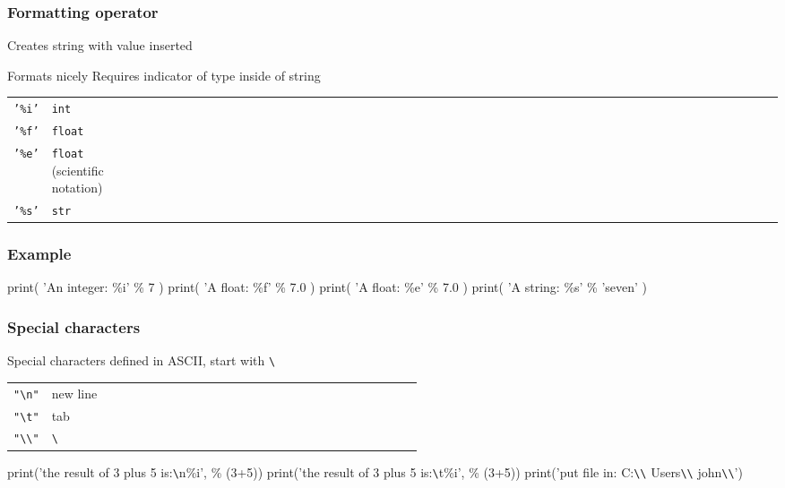 \documentclass[11pt]{beamer}
\begin{document}
\begin{frame}
  \frametitle{Formatting operator}
  \Enlarge

  \begin{itemize}
  \myitem  Creates string with value inserted
    \begin{itemize}
    \mysubitem  Formats nicely
    \mysubitem  Requires indicator of type inside of string
      \begin{tabular}{*{27}{ll}}
        \texttt{'\%i'} & \texttt{int} \\
        \texttt{'\%f'} & \texttt{float} \\
        \texttt{'\%e'} & \texttt{float} (scientific notation) \\
        \texttt{'\%s'} & \texttt{str}
      \end{tabular}
    \end{itemize}
  \end{itemize}
\end{frame}

\begin{frame}[fragile]
  \frametitle{Example}
  \Enlarge

  \begin{semiverbatim}
print( 'An integer:  \%i' \% 7 )
print( 'A float:     \%f' \% 7.0 )
print( 'A float:     \%e' \% 7.0 )
print( 'A string:    \%s' \% 'seven' )
  \end{semiverbatim}
\end{frame}

\begin{frame}
  \frametitle{Special characters}
  \Enlarge

  \begin{itemize}
  \myitem  Special characters defined in ASCII, start with \texttt{\textbackslash}
    \begin{tabular}{*{27}{l}}
      \texttt{"\textbackslash n"} & new line \\
      \texttt{"\textbackslash t"} & tab \\
      \texttt{"\textbackslash \textbackslash"} & \texttt{\textbackslash} \\
    \end{tabular}
  \myitem print('the result of 3 plus 5 is:\texttt{\textbackslash}n\%i', \% (3+5))
  \myitem print('the result of 3 plus 5 is:\texttt{\textbackslash}t\%i', \% (3+5))
  \myitem print('put file in: C:\texttt{\textbackslash \textbackslash} Users\texttt{\textbackslash \textbackslash} john\texttt{\textbackslash \textbackslash}')
  \end{itemize}
\end{frame}
\end{document}
